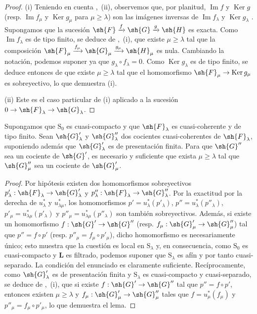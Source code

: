 \begin{proof}
(i) Teniendo en cuenta ,~(ii), observemos que, por planitud, $\operatorname{Im} f$ y $\operatorname{Ker} g$ (resp. $\operatorname{Im} f_\mu$ y $\operatorname{Ker} g_\mu$ para $\mu\geqslant\lambda$) son las imágenes inversas de $\operatorname{Im} f_\lambda$ y $\operatorname{Ker} g_\lambda$ . Supongamos que la sucesión $\sh{F}\xrightarrow{f}\sh{G}\xrightarrow{g}\sh{H}$ es exacta. Como $\operatorname{Im} f_\lambda$ es de tipo finito, se deduce de ,~(i), que existe $\mu\geqslant\lambda$ tal que la composición $\sh{F}_\mu\xrightarrow{f_\mu}\sh{G}_\mu\xrightarrow{g_\mu}\sh{H}_\mu$ es nula. Cambiando la notación, podemos suponer ya que $g_\lambda\circ f_\lambda=0$. Como $\operatorname{Ker} g_\lambda$ es de tipo finito, se deduce entonces de  que existe $\mu\geqslant\lambda$ tal que el homomorfismo $\sh{F}_\mu\to\operatorname{Ker} g_\mu$ es sobreyectivo, lo que demuestra (i).

(ii) Este es el caso particular de (i) aplicado a la sucesión $0\to\sh{F}_\lambda\to\sh{G}_\lambda$.
\end{proof}

\begin{lemma}[8.5.9]
\label{IV.8.5.9}
Supongamos que $\mathrm{S}_0$ es cuasi-compacto y que $\sh{F}_\lambda$ es cuasi-coherente y de tipo finito. Sean $\sh{G}'_\lambda$ y $\sh{G}''_\lambda$ dos cocientes cuasi-coherentes de $\sh{F}_\lambda$, suponiendo además que $\sh{G}'_\lambda$ es de presentación finita. Para que $\sh{G}''$ sea un cociente de $\sh{G}'$, es necesario y suficiente que exista $\mu\geqslant\lambda$ tal que $\sh{G}''_\mu$ sea un cociente de $\sh{G}'_\mu$.
\end{lemma}

\begin{proof}
Por hipótesis existen dos homomorfismos sobreyectivos $p'_\lambda:\sh{F}_\lambda\to\sh{G}'_\lambda$ y $p''_\lambda:\sh{F}_\lambda\to\sh{G}''_\lambda$. Por la exactitud por la derecha de $u_\lambda^*$ y $u_{\lambda\mu}^*$, los homomorfismos $p'=u_\lambda^*(p'_\lambda)$, $p''=u_\lambda^*(p''_\lambda)$, $p'_\mu=u_{\lambda\mu}^*(p'_\lambda)$ y $p''_\mu=u_{\lambda\mu}^*(p''_\lambda)$ son también sobreyectivos. Además, si existe un homomorfismo $f:\sh{G}'\to\sh{G}''$ (resp. $f_\mu:\sh{G}'_\mu\to\sh{G}''_\mu$) tal que $p''=f\circ p'$ (resp. $p''_\mu=f_\mu\circ p'_\mu$), dicho homomorfismo es necesariamente único; esto muestra que la cuestión es local en $\mathrm{S}_\lambda$ y, en consecuencia, como $\mathrm{S}_0$ es cuasi-compacto y $\mathbf{L}$ es filtrado, podemos suponer que $\mathrm{S}_\lambda$ es afín y por tanto cuasi-separado. La condición del enunciado es claramente suficiente. Recíprocamente, como $\sh{G}'_\lambda$ es de presentación finita y $\mathrm{S}_\lambda$ es cuasi-compacto y cuasi-separado, se deduce de ,~(i), que si existe $f:\sh{G}'\to\sh{G}''$ tal que $p''=f\circ p'$, entonces existen $\mu\geqslant\lambda$ y $f_\mu:\sh{G}'_\mu\to\sh{G}''_\mu$ tales que $f=u_\mu^*(f_\mu)$ y $p''_\mu=f_\mu\circ p'_\mu$, lo que demuestra el lema.
\end{proof}

